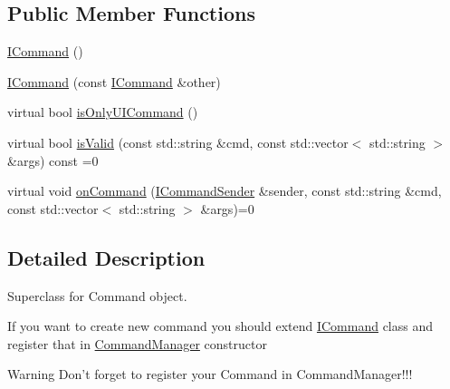 \subsection*{Public Member Functions}
\begin{DoxyCompactItemize}
\item 
\hyperlink{class_i_command_acf142bc073aaf829663ba395bacd34cc}{I\-Command} ()
\item 
\hyperlink{class_i_command_a1a3e297aea5c94d785060e49801860dc}{I\-Command} (const \hyperlink{class_i_command}{I\-Command} \&other)
\item 
virtual bool \hyperlink{class_i_command_ac2bd771dcd2fda5a951869bdc4928b48}{is\-Only\-U\-I\-Command} ()
\item 
virtual bool \hyperlink{class_i_command_acb0beea12bd5ec963884dc35d4d48014}{is\-Valid} (const std\-::string \&cmd, const std\-::vector$<$ std\-::string $>$ \&args) const =0
\item 
virtual void \hyperlink{class_i_command_a55f931bb7304e2bc591ba2edd717e86c}{on\-Command} (\hyperlink{class_i_command_sender}{I\-Command\-Sender} \&sender, const std\-::string \&cmd, const std\-::vector$<$ std\-::string $>$ \&args)=0
\end{DoxyCompactItemize}


\subsection{Detailed Description}
Superclass for Command object. 

If you want to create new command you should extend \hyperlink{class_i_command}{I\-Command} class and register that in \hyperlink{class_command_manager}{Command\-Manager} constructor

\begin{DoxyWarning}{Warning}
Don't forget to register your Command in Command\-Manager!!! 
\end{DoxyWarning}


